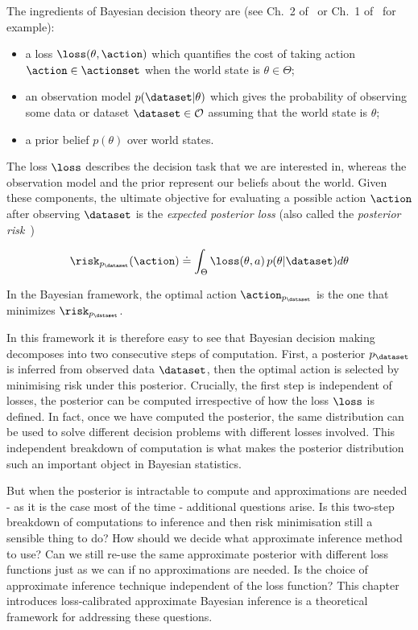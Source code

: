 The ingredients of Bayesian decision theory are (see Ch.~2 of~\citep{robert01choice} or Ch.~1 of~\citep{berger85decision} for example):
\vspace{-.3cm}
\begin{itemize}
  \item a loss $\loss(\theta,\action)$ which quantifies the cost of taking action $\action \in \actionset$ when the world state is $\theta \in \Theta$; %
  \item an observation model $p(\dataset|\theta)$ which gives the probability of observing some data or dataset $\dataset \in \mathcal{O}$ assuming that the world state is $\theta$;
  \item a prior belief $p(\theta)$ over world states.
\end{itemize}

The loss $\loss$ describes the decision task that we are interested in, whereas the observation model and the prior represent our beliefs about the world. Given these components, the ultimate objective for evaluating a possible action $\action$ after observing $\dataset$ is the \emph{expected posterior loss} (also called the \emph{posterior risk}~\citep{schervish95theory})

\begin{equation}
	\risk_{p_\dataset}(\action) \doteq \int_\Theta \loss(\theta, a) \, p(\theta|\dataset) d\theta
\end{equation}

In the Bayesian framework, the optimal action $\action_{p_\dataset}$ is the one that minimizes $\risk_{p_\dataset}$.

In this framework it is therefore easy to see that Bayesian decision making decomposes into two consecutive steps of computation. First, a posterior $p_\dataset$ is inferred from observed data $\dataset$, then the optimal action is selected by minimising risk under this posterior. Crucially, the first step is independent of losses, the posterior can be computed irrespective of how the loss $\loss$ is defined. In fact, once we have computed the posterior, the same distribution can be used to solve different decision problems with different losses involved. This independent breakdown of computation is what makes the posterior distribution such an important object in Bayesian statistics.

But when the posterior is intractable to compute and approximations are needed - as it is the case most of the time - additional questions arise. Is this two-step breakdown of computations to inference and then risk minimisation still a sensible thing to do? How should we decide what approximate inference method to use? Can we still re-use the same approximate posterior with different loss functions just as we can if no approximations are needed. Is the choice of approximate inference technique independent of the loss function? This chapter introduces loss-calibrated approximate Bayesian inference is a theoretical framework for addressing these questions.


